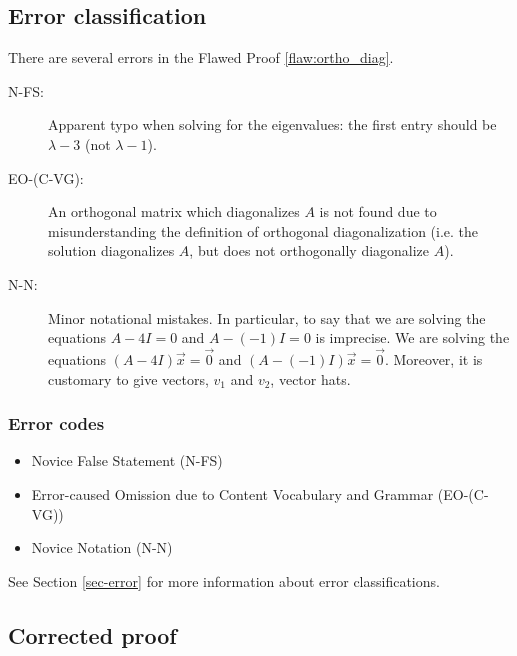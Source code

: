 \clearpage
\subsection{Error classification}


There are several errors
 in the Flawed Proof \ref{flaw:ortho_diag}. %


 \begin{description}
 \item[N-FS:] Apparent typo when solving for the eigenvalues: the first entry should be $\lambda-3$ (not $\lambda - 1$).
     
 	\item[EO-(C-VG):] An orthogonal matrix which diagonalizes $A$ is not found due to misunderstanding the definition of orthogonal diagonalization  (i.e. the solution diagonalizes $A$, but does not orthogonally diagonalize $A$).
 
 \item[N-N:] Minor notational mistakes. In particular, to say that we are solving the equations $A - 4I = 0$ and $A - (-1)I = 0$ is imprecise. We are solving the equations $(A - 4I)\vec{x} = \vec{0}$ and $(A - (-1)I)\vec{x} = \vec{0}$. Moreover, it is customary to give vectors, $v_1$ and $v_2$, vector hats.
 \end{description}


\subsubsection{Error codes}
\begin{itemize}

\item Novice False Statement (N-FS)

	\item 	Error-caused Omission due to Content Vocabulary and Grammar (EO-(C-VG))

\item Novice Notation (N-N)
\end{itemize}
See Section \ref{sec-error} for more information about error classifications.

\clearpage
\subsection{Corrected proof}

